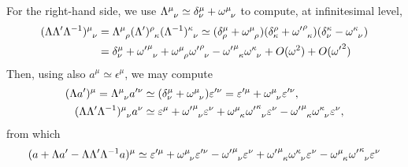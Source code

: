 \begin{mdframed}
\begin{innerproof}
    For the right-hand side, we use $\tensor{\Lambda}{^\mu_\nu} \simeq \delta^\mu_\nu + \tensor{\omega}{^\mu_\nu}$ to compute, at infinitesimal level,
    \begin{align*}
        \tensor{(\Lambda\Lambda'\Lambda^{-1})}{^\mu_\nu} &= \tensor{\Lambda}{^\mu_\rho}\tensor{(\Lambda')}{^\rho_\kappa}\tensor{(\Lambda^{-1})}{^\kappa_\nu} \simeq (\delta^\mu_\rho + \tensor{\omega}{^\mu_\rho})(\delta^\rho_\kappa + \tensor{{\omega'}}{^\rho_\kappa})(\delta^\kappa_\nu - \tensor{\omega}{^\kappa_\nu}) \\
        &= \delta^\mu_\nu + \tensor{{\omega'}}{^\mu_\nu} + \tensor{\omega}{^\mu_\rho}\tensor{{\omega'}}{^\rho_\nu} - \tensor{{\omega'}}{^\mu_\kappa}\tensor{\omega}{^\kappa_\nu} + O(\omega^2) + O({\omega'}^2)
    \end{align*}
    Then, using also $a^\mu \simeq \epsilon^\mu$, we may compute
    \begin{align*}
        (\Lambda a')^\mu = \tensor{\Lambda}{^\mu_\nu} a'^\nu &\simeq (\delta^\mu_\nu + \tensor{\omega}{^\mu_\nu}) \epsilon'^\nu = \epsilon'^\mu + \tensor{\omega}{^\mu_\nu} \epsilon'^\nu , \\
        \tensor{(\Lambda\Lambda'\Lambda^{-1})}{^\mu_\nu} a^\nu &\simeq \epsilon^\mu + \tensor{{\omega'}}{^\mu_\nu} \epsilon^\nu + \tensor{\omega}{^\mu_\kappa}\tensor{{\omega'}}{^\kappa_\nu} \epsilon^\nu - \tensor{{\omega'}}{^\mu_\kappa}\tensor{\omega}{^\kappa_\nu} \epsilon^\nu ,
    \end{align*}
    from which
    \begin{equation*}
        (a + \Lambda a' - \Lambda \Lambda' \Lambda^{-1}a)^\mu \simeq \epsilon'^\mu + \tensor{\omega}{^\mu_\nu} \epsilon'^\nu - \tensor{{\omega'}}{^\mu_\nu} \epsilon^\nu + \tensor{{\omega'}}{^\mu_\kappa}\tensor{\omega}{^\kappa_\nu} \epsilon^\nu - \tensor{\omega}{^\mu_\kappa}\tensor{{\omega'}}{^\kappa_\nu} \epsilon^\nu
    \end{equation*}


\end{innerproof}
\end{mdframed}

